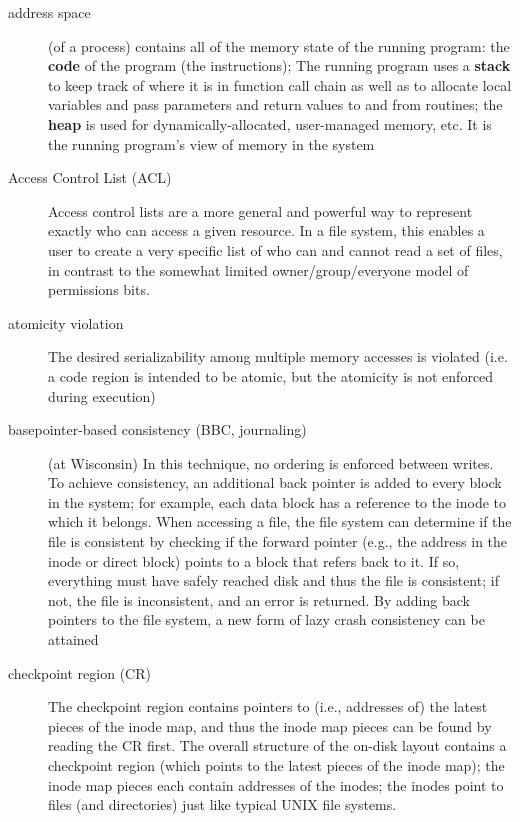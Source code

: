 \begin{description}
\item[address space] (of a process) contains all of the memory state of the
running program: the \textbf{code} of the program (the instructions); The running program uses a \textbf{stack} to keep track of where it is in function call chain as well as to allocate local variables and pass parameters and return values to and from routines; the \textbf{heap} is used for dynamically-allocated, user-managed memory, etc.  It is the running program’s view of memory in the system

\item[Access Control List (ACL)]  Access control lists are a more general and powerful way to represent exactly who can access a given resource. In a file system, this enables a user to create a very specific list of who can and cannot read a set of files, in contrast to the somewhat limited owner/group/everyone model of permissions bits.

\item[atomicity violation] The desired serializability among multiple memory accesses is violated (i.e. a code region is intended to be atomic, but the atomicity is not enforced during execution)

\item[basepointer-based consistency (BBC, journaling)] (at Wisconsin) In this technique, no ordering is enforced between writes. To achieve consistency, an additional back pointer is added to every block in the system; for example, each data block has a reference to the inode to which it belongs. When accessing a file, the file system can determine if the file is consistent by checking if the forward pointer (e.g., the address in the inode or direct block) points to a block that refers back to it. If so, everything must have safely reached disk and thus the file is consistent; if not, the file is inconsistent, and an error is returned. By adding back pointers to the file system, a new form of lazy crash consistency can be attained

\item[checkpoint region (CR)] The checkpoint region contains pointers to (i.e., addresses of) the latest pieces of the inode map, and thus the inode map pieces can be found by reading the CR first. The overall structure of the on-disk layout contains a checkpoint region (which points to the latest pieces of the inode map); the inode map pieces each contain addresses of the inodes; the inodes point to files (and directories) just like typical UNIX file systems.


\end{description}
